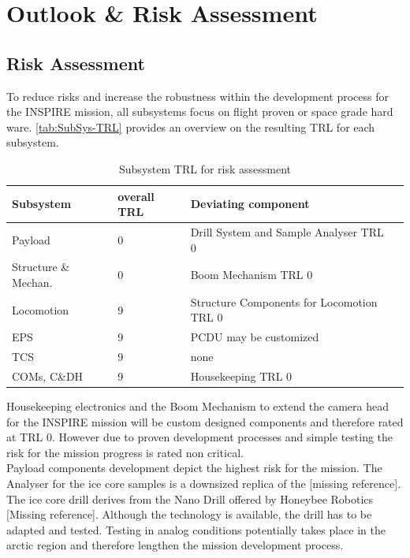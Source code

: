 \chapter{Outlook \& Risk Assessment}
\label{chap:outlook}

\section{Risk Assessment}
\label{sec:RiskAssessment}

To reduce risks and increase the robustness within the development process for the INSPIRE mission, all subsystems focus on flight proven or space grade hard ware. \autoref{tab:SubSys-TRL} provides an overview on the resulting TRL for each subsystem. 
 
\begin{table}[h]
\centering
\caption{Subsystem TRL for risk assessment}
\begin{tabular}{llll}
\toprule
Subsystem            & overall TRL & Deviating component      &  \\
\midrule
Payload              & 0           & Drill System and Sample Analyser TRL 0 &  \\
Structure \& Mechan. & 0           & Boom Mechanism TRL 0     &  \\
Locomotion           & 9           & Structure Components for Locomotion TRL 0                     &  \\
EPS                  & 9           & PCDU may be customized                     &  \\
TCS                  & 9           & none                     &  \\
COMs, C\&DH          & 9           & Housekeeping TRL 0       & 	 \\
\bottomrule
\end{tabular}
\label{tab:SubSys-TRL}
\end{table}

Housekeeping electronics and the Boom Mechanism to extend the camera head for the INSPIRE mission will be custom designed components and therefore rated at TRL 0. However due to proven development processes and simple testing the risk for the mission progress is rated non critical.  \\

Payload components development depict the highest risk for the mission. The Analyser for the ice core samples is a downsized replica of the [missing reference]. 
The ice core drill derives from the Nano Drill offered by Honeybee Robotics [Missing reference]. Although the technology is available, the drill has to be adapted and tested. Testing in analog conditions potentially takes place in the arctic region and therefore lengthen the mission development process. \\

